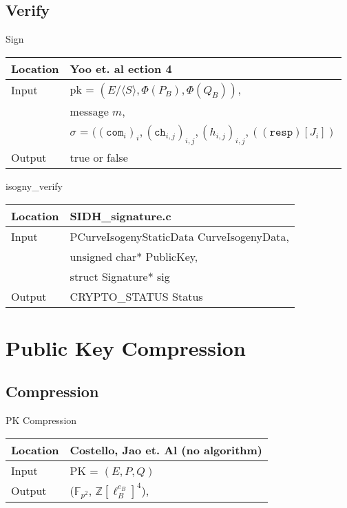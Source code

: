 \documentclass[10pt]{article}
\begin{document}
\subsection{Verify}

\parbox[t]{.40\linewidth}{
\centering
Sign
\begin{tabular}{@{}ll@{}}
	\toprule
	Location & Yoo et. al ection 4 \\
	\midrule
	Input & pk = $(E/\langle S \rangle, \Phi(P_B), \Phi(Q_B))$, \\
	& message $m$,\\
	& $\sigma$ = $((\texttt{com}_{i})_{i}, (\texttt{ch}_{i,j})_{i,j}, (h_{i,j})_{i,j}, ((\texttt{resp})[J_{i}])$\\
	\midrule
	Output & true or false\\
	\bottomrule
\end{tabular}}
\hfill
\parbox[t]{.40\linewidth}{
\centering
isogny\_verify
\begin{tabular}{@{}ll@{}}
	\toprule
	Location & SIDH\_signature.c \\
	\midrule
	Input & PCurveIsogenyStaticData CurveIsogenyData,\\
	& unsigned char* PublicKey,\\
	& struct Signature* sig\\
	\midrule
	Output & CRYPTO\_STATUS Status\\
	\bottomrule
\end{tabular}}

\section{Public Key Compression}

\subsection{Compression}

\begin{center}PK Compression\end{center}
\parbox{\linewidth}{
\centering
\begin{tabular}{@{}ll@{}}
	\toprule
	Location & Costello, Jao et. Al (no algorithm)\\
	\midrule
	Input & PK = $(E,P,Q)$\\
	\midrule
	Output & ($\mathbb{F}_{p^2}$, $\mathbb{Z}[\ell_{B}^{e_B}]^{4}$),\\
	\bottomrule
\end{tabular}}
\hfill
\end{document}
